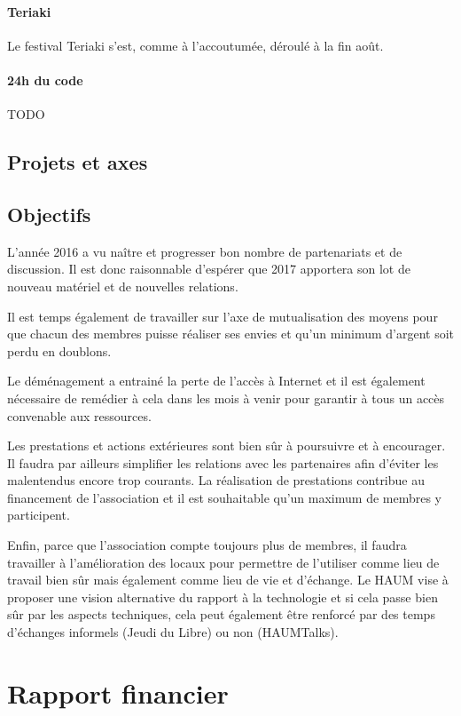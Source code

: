 \documentclass[11pt]{article}
\begin{document}
\paragraph{Teriaki} Le festival Teriaki s'est, comme à l'accoutumée, déroulé à la fin
août.

\paragraph{24h du code}

TODO

\subsection{Projets et axes}

\subsection{Objectifs}

L'année 2016 a vu naître et progresser bon nombre de partenariats et de discussion. Il est donc raisonnable d'espérer que 2017 apportera son lot de nouveau matériel et de nouvelles relations.

Il est temps également de travailler sur l'axe de mutualisation des moyens pour que chacun des membres puisse réaliser ses envies et qu'un minimum d'argent soit perdu en doublons.

Le déménagement a entrainé la perte de l'accès à Internet et il est également nécessaire de remédier à cela dans les mois à venir pour garantir à tous un accès convenable aux ressources.

Les prestations et actions extérieures sont bien sûr à poursuivre et à encourager. Il faudra par ailleurs simplifier les relations avec les partenaires afin d'éviter les malentendus encore trop courants. La réalisation de prestations contribue au financement de l'association et il est souhaitable qu'un maximum de membres y participent.

Enfin, parce que l'association compte toujours plus de membres, il faudra travailler à l'amélioration des locaux pour permettre de l'utiliser comme lieu de travail bien sûr mais également comme lieu de vie et d'échange. Le HAUM vise à proposer une vision alternative du rapport à la technologie et si cela passe bien sûr par les aspects techniques, cela peut également être renforcé par des temps d'échanges informels (Jeudi du Libre) ou non (HAUMTalks).

\section{Rapport financier}
\end{document}
